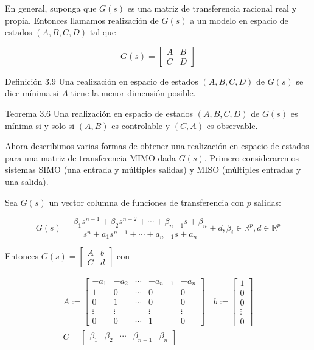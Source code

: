 \documentclass[11pt]{article}
\begin{document}
En general, suponga que $G(s)$ es una matriz de transferencia racional real y propia. Entonces llamamos realización de $G(s)$ a un modelo en espacio de estados $(A, B, C, D)$ tal que

$$
G(s)=\left[\begin{array}{c|c}
A & B \\
\hline C & D
\end{array}\right]
$$

Definición 3.9 Una realización en espacio de estados $(A, B, C, D)$ de $G(s)$ se dice mínima si $A$ tiene la menor dimensión posible.

Teorema 3.6 Una realización en espacio de estados $(A, B, C, D)$ de $G(s)$ es mínima si y solo si $(A, B)$ es controlable y $(C, A)$ es observable.

Ahora describimos varias formas de obtener una realización en espacio de estados para una matriz de transferencia MIMO dada $G(s)$. Primero consideraremos sistemas SIMO (una entrada y múltiples salidas) y MISO (múltiples entradas y una salida).

Sea $G(s)$ un vector columna de funciones de transferencia con $p$ salidas:

$$
G(s)=\frac{\beta_{1} s^{n-1}+\beta_{2} s^{n-2}+\cdots+\beta_{n-1} s+\beta_{n}}{s^{n}+a_{1} s^{n-1}+\cdots+a_{n-1} s+a_{n}}+d, \beta_{i} \in \mathbb{R}^{p}, d \in \mathbb{R}^{p}
$$

Entonces $G(s)=\left[\begin{array}{l|l}A & b \\ \hline C & d\end{array}\right]$ con

$$
\begin{gathered}
A:=\left[\begin{array}{ccccc}
-a_{1} & -a_{2} & \cdots & -a_{n-1} & -a_{n} \\
1 & 0 & \cdots & 0 & 0 \\
0 & 1 & \cdots & 0 & 0 \\
\vdots & \vdots & & \vdots & \vdots \\
0 & 0 & \cdots & 1 & 0
\end{array}\right] \quad b:=\left[\begin{array}{c}
1 \\
0 \\
0 \\
\vdots \\
0
\end{array}\right] \\
C=\left[\begin{array}{lllll}
\beta_{1} & \beta_{2} & \cdots & \beta_{n-1} & \beta_{n}
\end{array}\right]
\end{gathered}
$$
\end{document}

